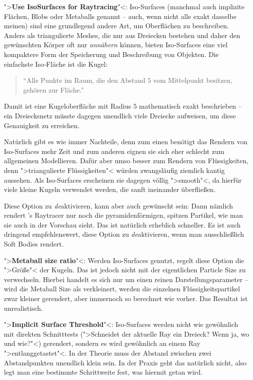 \documentclass[10pt,DIV=14,a4paper]{scrartcl}
\begin{document}
	\item ">\textbf{Use IsoSurfaces for Raytracing}"<: Iso-Surfaces
	(manchmal auch implizite Flächen, Blobs oder Metaballs genannt --
	auch, wenn nicht alle exakt dasselbe meinen) sind eine grundlegend
	andere Art, um Oberflächen zu beschreiben. Anders als triangulierte
	Meshes, die nur aus Dreiecken bestehen und daher den gewünschten
	Körper oft nur \emph{annähern} können, bieten Iso-Surfaces eine viel
	kompaktere Form der Speicherung und Beschreibung von Objekten. Die
	einfachste Iso-Fläche ist die Kugel:

	\begin{quote}
		"`Alle Punkte im Raum, die den Abstand $5$ vom Mittelpunkt
		besitzen, gehören zur Fläche."'
	\end{quote}

	Damit ist eine Kugeloberfläche mit Radius $5$ mathematisch exakt
	beschrieben -- ein Dreiecksnetz müsste dagegen unendlich viele
	Dreiecke aufweisen, um diese Genauigkeit zu erreichen.

	Natürlich gibt es wie immer Nachteile, denn zum einen benötigt das
	Rendern von Iso-Surfaces mehr Zeit und zum anderen eignen sie sich
	eher schlecht zum allgemeinen Modellieren. Dafür aber umso besser
	zum Rendern von Flüssigkeiten, denn ">triangulierte Flüssigkeiten"<
	würden zwangsläufig ziemlich kantig aussehen. Als Iso-Surfaces
	erscheinen sie dagegen völlig ">smooth"<, da hierfür viele kleine
	Kugeln verwendet werden, die sanft ineinander überfließen.

	Diese Option zu \emph{de}aktivieren, kann aber auch gewünscht sein:
	Dann nämlich rendert \aoi's Raytracer nur noch die
	pyramidenförmigen, spitzen Partikel, wie man sie auch in der
	Vorschau sieht. Das ist natürlich erheblich schneller. Es ist auch
	dringend empfehlenswert, diese Option zu \emph{de}aktivieren, wenn
	man ausschließlich Soft Bodies rendert.

	\item ">\textbf{Metaball size ratio}"<: Werden Iso-Surfaces genutzt,
	regelt diese Option die ">Größe"< der Kugeln. Das ist jedoch nicht
	mit der eigentlichen Particle Size zu verwechseln. Hierbei handelt
	es sich nur um einen reinen Darstellungsparameter -- wird die
	Metaball Size als verkleinert, werden die einzelnen
	Flüssigkeitspartikel zwar kleiner gerendert, aber immernoch so
	berechnet wie vorher. Das Resultat ist unrealistisch.

	\item ">\textbf{Implicit Surface Threshold}"<: Iso-Surfaces werden
	nicht wie gewöhnlich mit direkten Schnitttests (">Schneidet der
	aktuelle Ray ein Dreieck? Wenn ja, wo und wie?"<) gerendert, sondern
	es wird gewöhnlich an einem Ray ">entlanggetastet"<. In der Theorie
	muss der Abstand zwischen zwei Abstandpunkten unendlich klein sein.
	In der Praxis geht das natürlich nicht, also legt man eine bestimmte
	Schrittweite fest, was hiermit getan wird.
\end{document}
